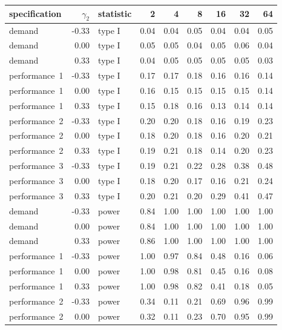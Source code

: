 \begin{table}[ht]
\centering
\begingroup\footnotesize
\begin{tabular}{lrlrrrrrr}
  \hline
specification & $\gamma_2$ & statistic & 2 & 4 & 8 & 16 & 32 & 64 \\ 
  \hline
demand & -0.33 & type I & 0.04 & 0.04 & 0.05 & 0.04 & 0.04 & 0.05 \\ 
  demand & 0.00 & type I & 0.05 & 0.05 & 0.04 & 0.05 & 0.06 & 0.04 \\ 
  demand & 0.33 & type I & 0.04 & 0.05 & 0.05 & 0.05 & 0.05 & 0.03 \\ 
  performance~1 & -0.33 & type I & 0.17 & 0.17 & 0.18 & 0.16 & 0.16 & 0.14 \\ 
  performance~1 & 0.00 & type I & 0.16 & 0.15 & 0.15 & 0.15 & 0.15 & 0.14 \\ 
  performance~1 & 0.33 & type I & 0.15 & 0.18 & 0.16 & 0.13 & 0.14 & 0.14 \\ 
  performance~2 & -0.33 & type I & 0.20 & 0.20 & 0.18 & 0.16 & 0.19 & 0.23 \\ 
  performance~2 & 0.00 & type I & 0.18 & 0.20 & 0.18 & 0.16 & 0.20 & 0.21 \\ 
  performance~2 & 0.33 & type I & 0.19 & 0.21 & 0.18 & 0.14 & 0.20 & 0.23 \\ 
  performance~3 & -0.33 & type I & 0.19 & 0.21 & 0.22 & 0.28 & 0.38 & 0.48 \\ 
  performance~3 & 0.00 & type I & 0.18 & 0.20 & 0.17 & 0.16 & 0.21 & 0.24 \\ 
  performance~3 & 0.33 & type I & 0.20 & 0.21 & 0.20 & 0.29 & 0.41 & 0.47 \\ 
  demand & -0.33 & power & 0.84 & 1.00 & 1.00 & 1.00 & 1.00 & 1.00 \\ 
  demand & 0.00 & power & 0.84 & 1.00 & 1.00 & 1.00 & 1.00 & 1.00 \\ 
  demand & 0.33 & power & 0.86 & 1.00 & 1.00 & 1.00 & 1.00 & 1.00 \\ 
  performance~1 & -0.33 & power & 1.00 & 0.97 & 0.84 & 0.48 & 0.16 & 0.06 \\ 
  performance~1 & 0.00 & power & 1.00 & 0.98 & 0.81 & 0.45 & 0.16 & 0.08 \\ 
  performance~1 & 0.33 & power & 1.00 & 0.98 & 0.82 & 0.41 & 0.18 & 0.05 \\ 
  performance~2 & -0.33 & power & 0.34 & 0.11 & 0.21 & 0.69 & 0.96 & 0.99 \\ 
  performance~2 & 0.00 & power & 0.32 & 0.11 & 0.23 & 0.70 & 0.95 & 0.99 \\ 

\end{tabular}
\end{table}
